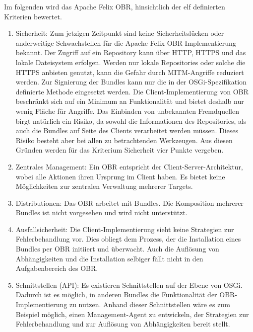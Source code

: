 Im folgenden wird das Apache Felix OBR, hinsichtlich der elf definierten Kriterien bewertet.

\begin{enumerate}[label={Nr. \arabic*}, leftmargin=*, labelindent=1em]
 \item Sicherheit:
 Zum jetzigen Zeitpunkt sind keine Sicherheitslücken oder anderweitige Schwachstellen für die Apache Felix OBR Implementierung bekannt.
 Der Zugriff auf ein Repository kann über \ac{HTTP}, \ac{HTTPS} und das lokale Dateisystem erfolgen.
 Werden nur lokale Repositories oder solche die \ac{HTTPS} anbieten genutzt, kann die Gefahr durch \ac{MITM}-Angriffe reduziert werden.
 Zur Signierung der Bundles kann nur die in der \ac{OSGi}-Spezifikation definierte Methode eingesetzt werden. 
 Die Client-Implementierung von \ac{OBR} beschränkt sich auf ein Minimum an Funktionalität und bietet deshalb nur wenig Fläche für Angriffe.
 Das Einbinden von unbekannten Fremdquellen birgt natürlich ein Risiko, da sowohl die Informationen des Repositories, als auch die Bundles auf Seite des 
 Clients verarbeitet werden müssen.
 Dieses Risiko besteht aber bei allen zu betrachtenden Werkzeugen.
 Aus diesen Gründen werden für das Kriterium Sicherheit vier Punkte vergeben.
 
 \item Zentrales Management: 
 Ein \ac{OBR} entspricht der Client-Server-Architektur, wobei alle Aktionen ihren Ursprung im Client haben.
 Es bietet keine Möglichkeiten zur zentralen Verwaltung mehrerer Targets.
 
 \item Distributionen:
 Das \ac{OBR} arbeitet mit Bundles. Die Komposition mehrerer Bundles ist nicht vorgesehen und wird nicht unterstützt.
 
 \item Ausfallsicherheit:
 Die Client-Implementierung sieht keine Strategien zur Fehlerbehandlung vor. Dies obliegt dem Prozess, der die Installation eines Bundles per 
 \ac{OBR} initiiert und überwacht. Auch die Auflösung von Abhängigkeiten und die Installation selbiger fällt nicht in den Aufgabenbereich des \ac{OBR}.
 
 \item Schnittstellen (\ac{API}):
 Es existieren Schnittstellen auf der Ebene von \ac{OSGi}. Dadurch ist es möglich, in anderen Bundles die Funktionalität der \ac{OBR}-Implementierung zu nutzen.
 Anhand dieser Schnittstellen wäre es zum Beispiel möglich, einen Management-Agent zu entwickeln, der Strategien zur Fehlerbehandlung und zur Auflösung von Abhängigkeiten
 bereit stellt.
 

\end{enumerate}
